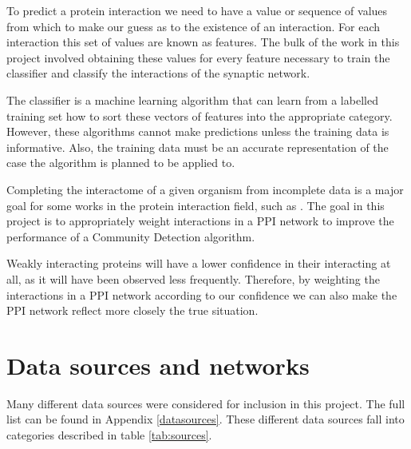 To predict a protein interaction we need to have a value or sequence of values from which to make our guess as to the existence of an interaction.
For each interaction this set of values are known as features.
The bulk of the work in this project involved obtaining these values for every feature necessary to train the classifier and classify the interactions of the synaptic network.

The classifier is a machine learning algorithm that can learn from a labelled training set how to sort these vectors of features into the appropriate category. %
However, these algorithms cannot make predictions unless the training data is informative.
Also, the training data must be an accurate representation of the case the algorithm is planned to be applied to.

Completing the interactome of a given organism from incomplete data is a major goal for some works in the protein interaction field, such as \textcite{rodgers-melnick_predicting_2013}.
The goal in this project is to appropriately weight interactions in a PPI network to improve the performance of a Community Detection algorithm.

Weakly interacting proteins will have a lower confidence in their interacting at all, as it will have been observed less frequently.
Therefore, by weighting the interactions in a PPI network according to our confidence we can also make the PPI network reflect more closely the true situation.

\section{Data sources and networks}
\label{back:sources}

Many different data sources were considered for inclusion in this project.
The full list can be found in Appendix \ref{datasources}.
These different data sources fall into categories described in table \ref{tab:sources}.

